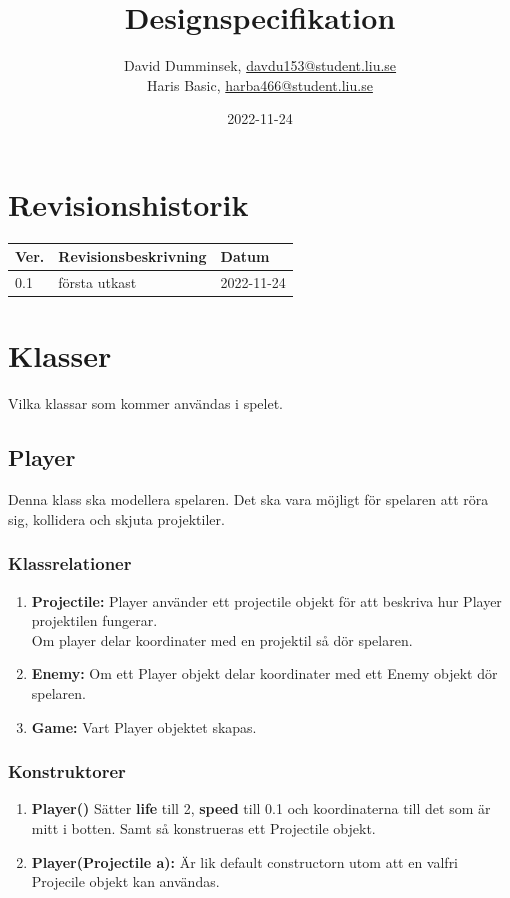 \documentclass{TDP005mall}
\author{David Dumminsek, \url{davdu153@student.liu.se}\\
  Haris Basic, \url{harba466@student.liu.se}\\}
\title{Designspecifikation}
\date{2022-11-24}
\begin{document}
\projectpage
\section{Revisionshistorik}
\begin{table}[!h]
\begin{tabularx}{\linewidth}{|l|X|l|}
\hline
Ver. & Revisionsbeskrivning & Datum \\\hline
  0.1 & första utkast & 2022-11-24\\\hline
\end{tabularx}
\end{table}


\section{Klasser}
Vilka klassar som kommer användas i spelet.

\subsection{Player}
Denna klass ska modellera spelaren.
Det ska vara möjligt för spelaren att röra sig, kollidera och skjuta projektiler.
\subsubsection*{Klassrelationer}
\begin{enumerate}
  \item \textbf{Projectile:} Player använder ett projectile objekt för att beskriva hur Player projektilen fungerar.\\
                    Om player delar koordinater med en projektil så dör spelaren.
  \item \textbf{Enemy:} Om ett Player objekt delar koordinater med ett Enemy objekt dör spelaren.
  \item \textbf{Game:} Vart Player objektet skapas.
\end{enumerate}
\subsubsection*{Konstruktorer}
\begin{enumerate}
  \item \textbf{Player()} Sätter \textbf{life} till 2, \textbf{speed} till 0.1 och koordinaterna till det som är mitt i botten. Samt så konstrueras ett Projectile objekt.
  \item \textbf{Player(Projectile a):} Är lik default constructorn utom att en valfri Projecile objekt kan användas.
\end{enumerate}
\end{document}
